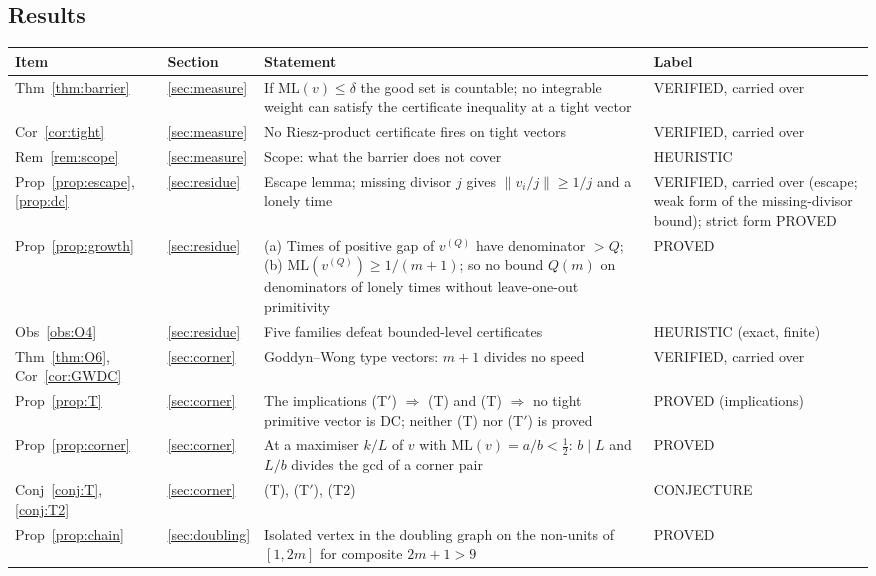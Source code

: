 \documentclass[11pt]{article}
\theoremstyle{remark}
\newcommand{\norm}[1]{\lVert #1\rVert}
\newcommand{\ML}{\mathrm{ML}}
\begin{document}
\subsection{Results}\label{sec:results}
\begin{center}\footnotesize
\begin{tabular}{@{}llp{7.0cm}p{2.2cm}@{}}
\toprule
Item & Section & Statement & Label\\
\midrule
Thm~\ref{thm:barrier} & \ref{sec:measure} & If $\ML(v)\le\delta$ the good set is countable; no integrable weight can satisfy the certificate inequality at a tight vector & VERIFIED, carried over\\
Cor~\ref{cor:tight} & \ref{sec:measure} & No Riesz-product certificate fires on tight vectors & VERIFIED, carried over\\
Rem~\ref{rem:scope} & \ref{sec:measure} & Scope: what the barrier does not cover & HEURISTIC\\
Prop~\ref{prop:escape}, \ref{prop:dc} & \ref{sec:residue} & Escape lemma; missing divisor $j$ gives $\norm{v_i/j}\ge1/j$ and a lonely time & VERIFIED, carried over (escape; weak form of the missing-divisor bound); strict form PROVED\\
Prop~\ref{prop:growth} & \ref{sec:residue} & (a) Times of positive gap of $v^{(Q)}$ have denominator $>Q$; (b) $\ML(v^{(Q)})\ge1/(m+1)$; so no bound $Q(m)$ on denominators of lonely times without leave-one-out primitivity & PROVED\\
Obs~\ref{obs:O4} & \ref{sec:residue} & Five families defeat bounded-level certificates & HEURISTIC (exact, finite)\\
Thm~\ref{thm:O6}, Cor~\ref{cor:GWDC} & \ref{sec:corner} & Goddyn--Wong type vectors: $m+1$ divides no speed & VERIFIED, carried over\\
Prop~\ref{prop:T} & \ref{sec:corner} & The implications (T$'$) $\Rightarrow$ (T) and (T) $\Rightarrow$ no tight primitive vector is DC; neither (T) nor (T$'$) is proved & PROVED (implications)\\
Prop~\ref{prop:corner} & \ref{sec:corner} & At a maximiser $k/L$ of $v$ with $\ML(v)=a/b<\frac12$: $b\mid L$ and $L/b$ divides the gcd of a corner pair & PROVED\\
Conj~\ref{conj:T}, \ref{conj:T2} & \ref{sec:corner} & (T), (T$'$), (T2) & CONJECTURE\\
Prop~\ref{prop:chain} & \ref{sec:doubling} & Isolated vertex in the doubling graph on the non-units of $[1,2m]$ for composite $2m+1>9$ & PROVED\\

\end{tabular}
\end{center}
\end{document}
